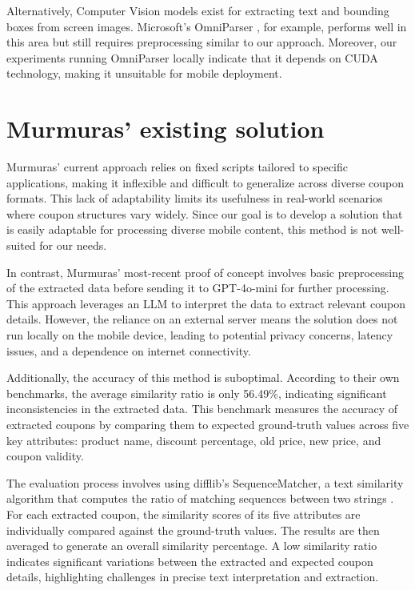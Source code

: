 \documentclass[licencjacka,en]{pracamgr}
\begin{document}
Alternatively, Computer Vision models exist for extracting text and bounding boxes from screen images. Microsoft’s OmniParser \cite{omniparser_intro}, for example, performs well in this area but still requires preprocessing similar to our approach. Moreover, our experiments running OmniParser locally indicate that it depends on CUDA technology, making it unsuitable for mobile deployment.

\section{Murmuras' existing solution} 
Murmuras' current approach relies on fixed scripts tailored to specific applications, making it inflexible and difficult to generalize across diverse coupon formats. This lack of adaptability limits its usefulness in real-world scenarios where coupon structures vary widely. Since our goal is to develop a solution that is easily adaptable for processing diverse mobile content, this method is not well-suited for our needs.

In contrast, Murmuras' most-recent proof of concept involves basic preprocessing of the extracted data before sending it to GPT-4o-mini for further processing. This approach leverages an LLM to interpret the data to extract relevant coupon details. However, the reliance on an external server means the solution does not run locally on the mobile device, leading to potential privacy concerns, latency issues, and a dependence on internet connectivity. 

Additionally, the accuracy of this method is suboptimal. According to their own benchmarks, the average similarity ratio is only 56.49\%, indicating significant inconsistencies in the extracted data. This benchmark measures the accuracy of extracted coupons by comparing them to expected ground-truth values across five key attributes: product name, discount percentage, old price, new price, and coupon validity.

The evaluation process involves using difflib’s SequenceMatcher, a text similarity algorithm that computes the ratio of matching sequences between two strings \cite{sequence_matcher}. For each extracted coupon, the similarity scores of its five attributes are individually compared against the ground-truth values. The results are then averaged to generate an overall similarity percentage. A low similarity ratio indicates significant variations between the extracted and expected coupon details, highlighting challenges in precise text interpretation and extraction. 
\end{document}
